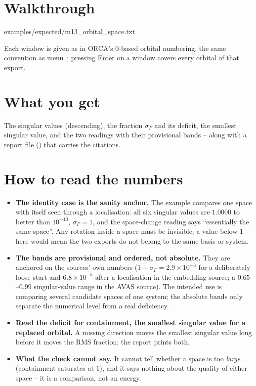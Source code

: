\section{Walkthrough}


  {examples/expected/m13_orbital_space.txt}

Each window is given as  in ORCA's 0-based orbital numbering,
the same convention as menu~; pressing Enter on a window covers every
orbital of that export.

\section{What you get}

The singular values (descending), the fraction $\sigma_F$ and its deficit, the
smallest singular value, and the two readings with their provisional bands --
along with a report file () that carries the
citations.

\section{How to read the numbers}

\begin{readbox}
\begin{itemize}
  \item \textbf{The identity case is the sanity anchor.} The example compares
    one space with itself seen through a localisation: all six singular values
    are $1.0000$ to better than $10^{-10}$, $\sigma_F = 1$, and the space-change
    reading says ``essentially the same space''. Any rotation inside a space
    must be invisible; a value below $1$ here would mean the two exports do not
    belong to the same basis or system.
  \item \textbf{The bands are provisional and ordered, not absolute.} They are
    anchored on the sources' own numbers ($1 - \sigma_F = 2.9\times10^{-3}$ for
    a deliberately loose start and $6.8\times10^{-5}$ after a localisation in
    the embedding source; a $0.65$--$0.99$ singular-value range in the AVAS
    source). The intended use is comparing several candidate spaces of one
    system; the absolute bands only separate the numerical level from a real
    deficiency.
  \item \textbf{Read the deficit for containment, the smallest singular value
    for a replaced orbital.} A missing direction moves the smallest singular
    value long before it moves the RMS fraction; the report prints both.
  \item \textbf{What the check cannot say.} It cannot tell whether a space is
    too \emph{large} (containment saturates at $1$), and it says nothing about
    the quality of either space -- it is a comparison, not an energy.
\end{itemize}
\end{readbox}

